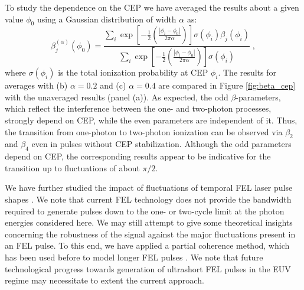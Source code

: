 To study the dependence on the CEP we have averaged the results about a given value $\phi_0$ using a Gaussian distribution of width $\alpha$ as: 
%
\begin{equation}
\beta_j^{(\alpha)}(\phi_0) 
= 
\frac{\sum_i \exp\left[-\frac{1}{2}\left(\frac{|\phi_i-\phi_0|}{2\pi\alpha}\right)\right] \sigma(\phi_i) \beta_j(\phi_i)}
{\sum_i\exp\left[-\frac{1}{2}\left(\frac{|\phi_i-\phi_0|}{2\pi\alpha}\right)\right] \sigma(\phi_i)}\; ,
    \label{eq:gauss_window}
\end{equation}
%
where $\sigma(\phi_i)$ is the total ionization probability at CEP $\phi_i$. The results for averages with (b) $\alpha = 0.2$ and (c) $\alpha = 0.4$ are compared in Figure \ref{fig:beta_cep} with the unaveraged results (panel (a)). As expected, the odd $\beta$-parameters, which reflect the interference between the one- and two-photon processes, strongly depend on CEP, while the even parameters are independent of it. Thus, the transition from one-photon to two-photon ionization can be observed via $\beta_2$ and $\beta_4$ even in pulses without CEP stabilization. Although the odd parameters depend on CEP, the corresponding results appear to be indicative for the transition up to fluctuations of about $\pi/2$.

We have further studied the impact of fluctuations of temporal FEL laser pulse shapes \cite{mitzner2008}. We note that current FEL technology does not provide the bandwidth required to generate pulses down to the one- or two-cycle limit at the photon energies considered here. We may still attempt to give some theoretical insights concerning the robustness of the signal against the major fluctuations present in an FEL pulse. To this end, we have applied a partial coherence method, which has been used before to model longer FEL pulses \cite{pfeiffer2010}. We note that future technological progress towards generation of ultrashort FEL pulses in the EUV regime may necessitate to extent the current approach.

